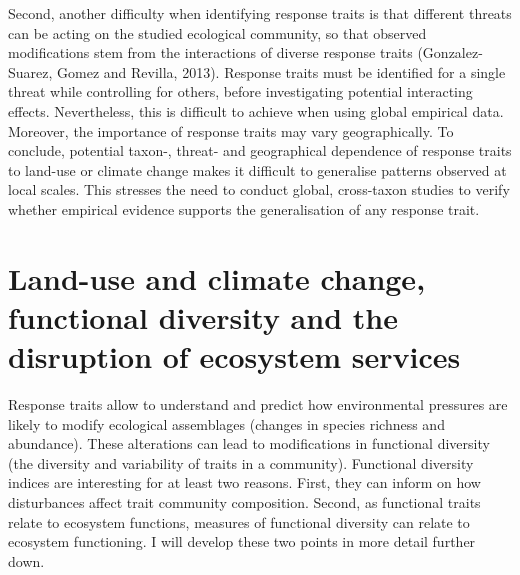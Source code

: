 Second, another difficulty when identifying response traits is that different threats can be acting on the studied ecological community, so that observed modifications stem from the interactions of diverse response traits (Gonzalez-Suarez, Gomez and Revilla, 2013). Response traits must be identified for a single threat while controlling for others, before investigating potential interacting effects. Nevertheless, this is difficult to achieve when using global empirical data. Moreover, the importance of response traits may vary geographically. To conclude, potential taxon-, threat- and geographical dependence of response traits to land-use or climate change makes it difficult to generalise patterns observed at local scales. This stresses the need to conduct global, cross-taxon studies to verify whether empirical evidence supports the generalisation of any response trait.

\section{Land-use and climate change, functional diversity and the disruption of ecosystem services}
Response traits allow to understand and predict how environmental pressures are likely to modify ecological assemblages (changes in species richness and abundance). These alterations can lead to modifications in functional diversity (the diversity and variability of traits in a community). Functional diversity indices are interesting for at least two reasons. First, they can inform on how disturbances affect trait community composition. Second, as functional traits relate to ecosystem functions, measures of functional diversity can relate to ecosystem functioning. I will develop these two points in more detail further down. 

